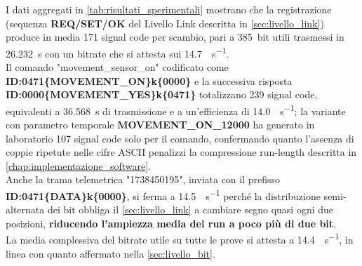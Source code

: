 \begin{table}[H]
    \centering

    \caption{Sintesi numerica delle tre campagne sperimentali condotte sul protocollo audio}
    \label{tab:risultati_sperimentali}
\end{table}

I dati aggregati in \autoref{tab:risultati_sperimentali} mostrano che la registrazione\\
 (sequenza \textbf{REQ/SET/OK} del Livello Link descritta in \autoref{sec:livello_link}) produce in media 
 171 signal code per scambio, pari a \SI{385}{bit} utili trasmessi in \SI{26.232}{\second} con un bitrate che
  si attesta sui \SI{14.7}{\bit\per\second}. \\ 
  Il comando "movement\_sensor\_on" codificato come\\ \textbf{ID:0471\{MOVEMENT\_ON\}k\{0000\}} 
  e la successiva risposta  \\
  \textbf{ID:0000\{MOVEMENT\_YES\}k\{0471\}} totalizzano 239 signal code, equivalenti a \SI{36.568}{\second} di
   trasmissione e a un'efficienza di \SI{14.0}{\bit\per\second}; la variante con parametro temporale \textbf{MOVEMENT\_ON\_12000} ha generato 
   in laboratorio 107 signal code solo per il comando, confermando quanto l'assenza di coppie ripetute nelle cifre ASCII penalizzi la compressione
    run-length descritta in \autoref{chap:implementazione_software}.\\
     Anche la trama telemetrica "1738450195", inviata con il prefisso\\
     \textbf{ID:0471\{DATA\}k\{0000\}}, si ferma a \SI{14.5}{\bit\per\second} perché la distribuzione semi-alternata dei bit obbliga il \autoref{sec:livello_link}
      a cambiare segno quasi ogni due posizioni, \textbf{riducendo l'ampiezza media dei run a poco più di due bit}.\\
        La media complessiva del bitrate utile su tutte le prove si attesta a \SI{14.4}{\bit\per\second}, in linea con quanto affermato nella \autoref{sec:livello_bit}.\\

